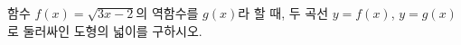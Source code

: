 \hspace*{2mm}\begin{minipage}[t]{\dimexpr\linewidth-2mm\relax}\vspace{0pt}
함수 $f(x)=\sqrt{3x-2}$의 역함수를 $g(x)$라 할 때, 두 곡선 $y=f(x)$, $y=g(x)$로 둘러싸인 도형의 넓이를 구하시오.\end{minipage}
